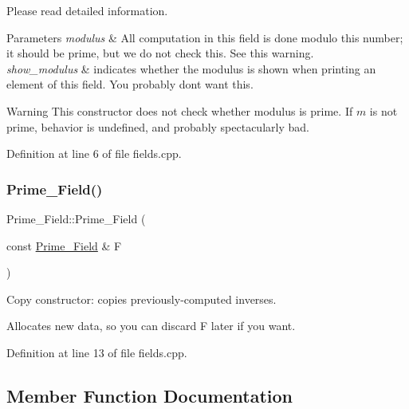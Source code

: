 Please read detailed information. 


\begin{DoxyParams}{Parameters}
{\em modulus} & All computation in this field is done modulo this number; it should be prime, but we do not check this. See this warning. \\
\hline
{\em show\+\_\+modulus} & indicates whether the modulus is shown when printing an element of this field. You probably don\textquotesingle{}t want this.\\
\hline
\end{DoxyParams}
\begin{DoxyWarning}{Warning}
This constructor does not check whether {\ttfamily modulus} is prime. If $m$ is not prime, behavior is undefined, and probably spectacularly bad. 
\end{DoxyWarning}


Definition at line 6 of file fields.\+cpp.

\mbox{\label{class_prime___field_a99ac17cca00c87af9ca859c8eae11006}} 
\subsubsection{\texorpdfstring{Prime\+\_\+\+Field()}{Prime\_Field()}\hspace{0.1cm}{\footnotesize\ttfamily [2/2]}}
{\footnotesize\ttfamily Prime\+\_\+\+Field\+::\+Prime\+\_\+\+Field (\begin{DoxyParamCaption}\item[{const \hyperlink{class_prime___field}{Prime\+\_\+\+Field} \&}]{F }\end{DoxyParamCaption})}



Copy constructor\+: copies previously-\/computed inverses. 

Allocates new data, so you can discard {\ttfamily F} later if you want. 

Definition at line 13 of file fields.\+cpp.



\subsection{Member Function Documentation}
\mbox{\label{class_prime___field_ab14cab08e6c2862e8470193112b69868}} 
